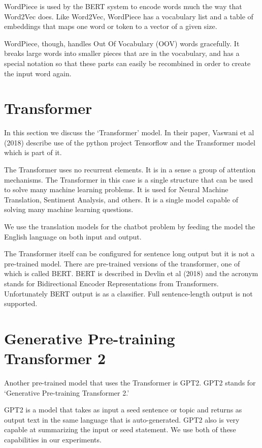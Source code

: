 WordPiece is used by the BERT system to encode words much the way that Word2Vec does. Like Word2Vec, WordPiece  has a vocabulary list and a table of embeddings that maps one word or token to a vector of a given size.

WordPiece, though, handles Out Of Vocabulary (OOV) words gracefully. It breaks large words into smaller pieces that are in the vocabulary, and has a special notation so that these parts can easily be recombined in order to create the input word again.


\section{Transformer}

In this section we discuss the `Transformer' model. In their paper, Vaswani et al (2018)\cite{tensor2tensor} describe use of the python project Tensorflow and the Transformer model which is part of it.

The Transformer uses no recurrent elements. It is in a sense a group of attention mechanisms. The Transformer in this case is a single structure that can be used to solve many machine learning problems. It is used for Neural Machine Translation, Sentiment Analysis, and others. It is a single model capable of solving many machine learning questions.

We use the translation models for the chatbot problem by feeding the model the English language on both input and output. 

The Transformer itself can be configured for sentence long output but it is not a pre-trained model. There are pre-trained versions of the transformer, one of which is called BERT. BERT is described in Devlin et al (2018)\cite{DBLP:journals/corr/abs-1810-04805} and the acronym stands for Bidirectional Encoder Representations from Transformers. Unfortunately BERT output is as a 
classifier. Full sentence-length output is not supported.

\section{Generative Pre-training Transformer 2}

Another pre-trained model that uses the Transformer is GPT2. GPT2 stands for `Generative Pre-training Transformer 2.'

GPT2 is a model that takes as input a seed sentence or topic and returns as output text in the same language that is auto-generated. GPT2 also is very capable at summarizing the input or seed statement. We use both of these capabilities in our experiments.

